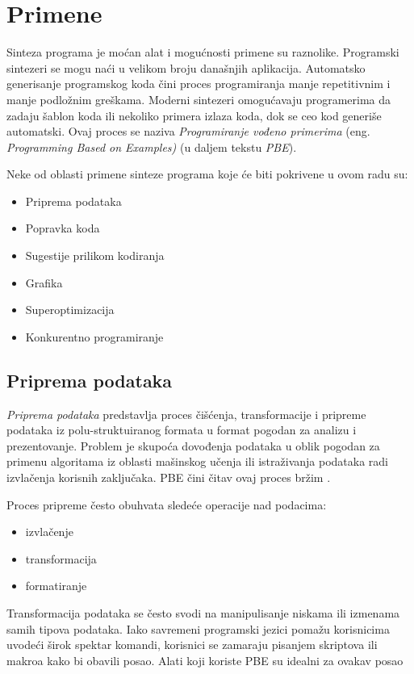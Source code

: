 \section{Primene}
\label{sec:Primene}

Sinteza programa je moćan alat i mogućnosti primene su raznolike. Programski sintezeri se mogu naći u velikom broju današnjih aplikacija. Automatsko generisanje programskog koda čini proces programiranja manje repetitivnim i manje podložnim greškama. Moderni sintezeri omo\-gu\-ća\-va\-ju programerima da zadaju šablon koda ili nekoliko primera izlaza koda, dok se ceo kod generiše automatski. Ovaj proces se naziva \emph{Programiranje vođeno primerima} (eng. \emph{Programming Based on Examples)} \cite{ProgrammingBasedOnExamples} (u daljem tekstu \emph{PBE}).

Neke od oblasti primene sinteze programa koje će biti pokrivene u ovom radu su:
\begin{itemize}
    \item Priprema podataka
    \item Popravka koda
    \item Sugestije prilikom kodiranja
    \item Grafika
    \item Superoptimizacija
    \item Konkurentno programiranje
\end{itemize}


\subsection{Priprema podataka}
\label{subsec:PripremaPodataka}

\emph{Priprema podataka} predstavlja proces čišćenja, transformacije i pripreme podataka iz polu-struktuiranog formata u format pogodan za analizu i prezentovanje. Problem je skupoća dovođenja podataka u oblik pogodan za primenu algoritama iz oblasti mašinskog učenja ili istraživanja podataka radi izvlačenja korisnih zaključaka. PBE čini čitav ovaj proces bržim \cite{ProgrammingBasedOnExamples}.

Proces pripreme često obuhvata sledeće operacije nad podacima:
\begin{itemize}
    \item izvlačenje
    \item transformacija
    \item formatiranje
\end{itemize}

Transformacija podataka se često svodi na manipulisanje niskama ili izmenama samih tipova podataka. Iako savremeni programski jezici pomažu korisnicima uvodeći širok spektar komandi, korisnici se zamaraju pisanjem skriptova ili makroa kako bi obavili posao. Alati koji koriste PBE su idealni za ovakav posao \cite{ProgrammingBasedOnExamples, SynthesizingNumberTransformationsFromIOExamples}


